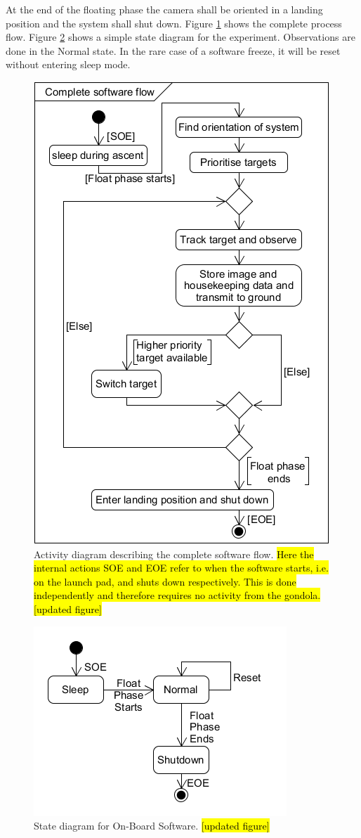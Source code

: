 At the end of the floating phase the camera shall be oriented in a landing position and the system shall shut down. Figure \ref{fig:software-activity-diagram} shows the complete process flow. Figure \ref{fig:software-state-diagram} shows a simple state diagram for the experiment. Observations are done in the Normal state. In the rare case of a software freeze, it will be reset without entering sleep mode.

\begin{figure}[H]
    \centering
    \includegraphics[width=.5\textwidth]{4-experiment-design/img/software/activity-diagram.png}
    \caption{Activity diagram describing the complete software flow. \hl{Here the internal actions SOE and EOE refer to when the software starts, i.e. on the launch pad, and shuts down respectively. This is done independently and therefore requires no activity from the gondola.} \hl{[updated figure]}}
    \label{fig:software-activity-diagram}
\end{figure}

\begin{figure}[H]
	\centering
	\includegraphics[width=.5\textwidth]{4-experiment-design/img/software/state-diagram.png}
	\caption{State diagram for On-Board Software. \hl{[updated figure]}}
	\label{fig:software-state-diagram}
\end{figure}

